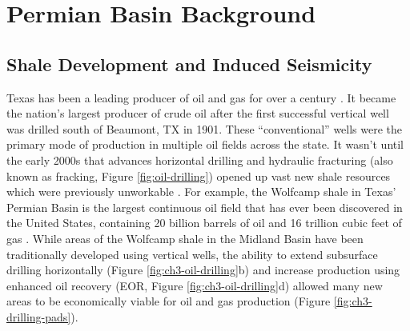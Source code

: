 
\chapter{ Permian Basin Background}
\label{CHAP:3}





\section{Shale Development and Induced Seismicity}
\label{sec:ch3-oil}

Texas has been a leading producer of oil and gas for over a century \citep{Frohlich2016HistoricalReviewInduced, TheAcademyofMedicine2017EnvironmentalCommunityImpacts}. It became the nation's largest producer of crude oil after the first successful vertical well was drilled south of Beaumont, TX in 1901. These ``conventional'' wells were the primary mode of production in multiple oil fields across the state. It wasn't until the early 2000s that advances horizontal drilling and hydraulic fracturing (also known as fracking, Figure \ref{fig:oil-drilling}) opened up vast new shale resources which were previously unworkable \citep{Waters2006Spe103202Ms}. 
For example, the Wolfcamp shale in Texas' Permian Basin is the largest continuous oil field that has ever been discovered in the United States, containing 20 billion barrels of oil and 16 trillion cubic feet of gas \citep{Gaswirth2016AssessmentUndiscoveredContinuous}. While areas of the Wolfcamp shale in the Midland Basin have been traditionally developed using vertical wells, the ability to extend subsurface drilling horizontally (Figure \ref{fig:ch3-oil-drilling}b) and increase production using enhanced oil recovery (EOR, Figure \ref{fig:ch3-oil-drilling}d)
allowed many new areas to be economically viable for oil and gas production (Figure \ref{fig:ch3-drilling-pads}).




